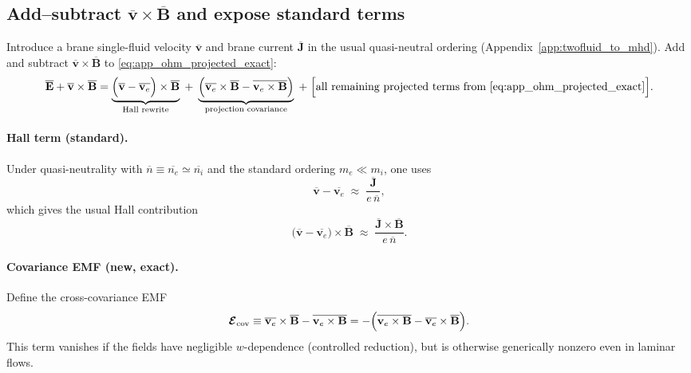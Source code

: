 \documentclass[11pt]{article}
\begin{document}
\subsection{Add--subtract \texorpdfstring{$\overline{\mathbf{v}}\times\overline{\mathbf{B}}$}{vbar x Bbar} and expose standard terms}
\label{app:ohm_add_subtract}

Introduce a brane single-fluid velocity \(\overline{\mathbf{v}}\) and brane current
\(\overline{\mathbf{J}}\) in the usual quasi-neutral ordering (Appendix~\ref{app:twofluid_to_mhd}).
Add and subtract \(\overline{\mathbf{v}}\times\overline{\mathbf{B}}\) to \eqref{eq:app_ohm_projected_exact}:
\begin{equation}
\overline{\mathbf{E}}+\overline{\mathbf{v}}\times\overline{\mathbf{B}}
=
\underbrace{\Big(\overline{\mathbf{v}}-\overline{\mathbf{v}_e}\Big)\times\overline{\mathbf{B}}}_{\text{Hall rewrite}}
\;+\;
\underbrace{\Big(\overline{\mathbf{v}_e}\times\overline{\mathbf{B}}-\overline{\mathbf{v}_e\times\mathbf{B}}\Big)}_{\text{projection covariance}}
\;+\;
\Big[\text{all remaining projected terms from \eqref{eq:app_ohm_projected_exact}}\Big].
\label{eq:app_ohm_split_step}
\end{equation}

\paragraph{Hall term (standard).}
Under quasi-neutrality with \(\overline{n}\equiv \overline{n_e}\simeq \overline{n_i}\) and the
standard ordering \(m_e\ll m_i\), one uses
\begin{equation}
\overline{\mathbf{v}}-\overline{\mathbf{v}_e}
\;\approx\;
\frac{\overline{\mathbf{J}}}{e\,\overline{n}},
\label{eq:app_hall_approx}
\end{equation}
which gives the usual Hall contribution
\begin{equation}
\Big(\overline{\mathbf{v}}-\overline{\mathbf{v}_e}\Big)\times\overline{\mathbf{B}}
\;\approx\;
\frac{\overline{\mathbf{J}}\times\overline{\mathbf{B}}}{e\,\overline{n}}.
\label{eq:app_hall_term}
\end{equation}

\paragraph{Covariance EMF (new, exact).}
Define the cross-covariance EMF
\begin{equation}
\boldsymbol{\mathcal{E}}_{\rm cov}
\equiv
\overline{\mathbf{v}_e}\times\overline{\mathbf{B}}-\overline{\mathbf{v}_e\times\mathbf{B}}
=
-\Big(\overline{\mathbf{v}_e\times\mathbf{B}}-\overline{\mathbf{v}_e}\times\overline{\mathbf{B}}\Big).
\label{eq:app_Ecov_def}
\end{equation}
This term vanishes if the fields have negligible \(w\)-dependence (controlled reduction), but is
otherwise generically nonzero even in laminar flows.
\end{document}
